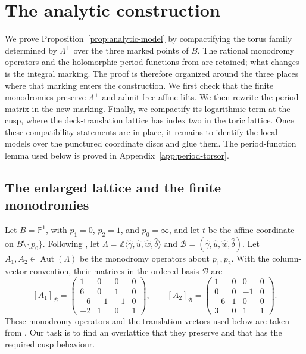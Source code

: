 \documentclass[11pt]{article}
\theoremstyle{definition}
\theoremstyle{remark}
\numberwithin{equation}{section}
\newcommand{\PP}{\mathbb P}
\newcommand{\ZZ}{\mathbb Z}
\begin{document}
\section{The analytic construction}\label{sec:analytic-construction}

We prove Proposition~\ref{prop:analytic-model} by compactifying the torus
family determined by $\Lambda^+$ over the three marked points of $B$.
The rational monodromy operators and the holomorphic period functions from
\citep[Sections~2--3]{Alpoge2026} are retained; what changes is the integral
marking.  The proof is therefore organized around the three places where
that marking enters the construction.  We first check that the finite
monodromies preserve $\Lambda^+$ and admit free affine lifts.  We then
rewrite the period matrix in the new marking.  Finally, we compactify its
logarithmic term at the cusp, where the deck-translation lattice has index
two in the toric lattice.  Once these compatibility statements are in
place, it remains to identify the local models over the punctured coordinate
discs and glue them.  The period-function lemma used below is proved in
Appendix~\ref{app:period-torsor}.

\subsection{The enlarged lattice and the finite monodromies}

Let $B=\PP^1$, with $p_1=0$, $p_2=1$, and $p_0=\infty$, and let
$t$ be the affine coordinate on $B\setminus\{p_0\}$.  Following
\citep[Section~2.1]{Alpoge2026}, let
$\Lambda=\ZZ\langle\widehat\gamma,\widehat u,\widehat w,
\widehat\delta\rangle$ and
$\mathcal B=(\widehat\gamma,\widehat u,\widehat w,\widehat\delta)$.
Let $A_1,A_2\in\operatorname{Aut}(\Lambda)$ be the monodromy operators
about $p_1,p_2$.  With the column-vector convention, their matrices in
the ordered basis $\mathcal B$ are
\begin{equation}\label{eq:an-original-monodromy-matrices}
 [A_1]_{\mathcal B}=
 \begin{pmatrix}
 1&0&0&0\\
 6&0&1&0\\
 -6&-1&-1&0\\
 -2&1&0&1
 \end{pmatrix},
 \qquad
 [A_2]_{\mathcal B}=
 \begin{pmatrix}
 1&0&0&0\\
 0&0&-1&0\\
 -6&1&0&0\\
 3&0&1&1
 \end{pmatrix}.
\end{equation}
These monodromy operators and the translation vectors used below are taken
from \citep[Lemmas~2.4 and~2.6]{Alpoge2026}.  Our task is to find an
overlattice that they preserve and that has the required cusp behaviour.
\end{document}
